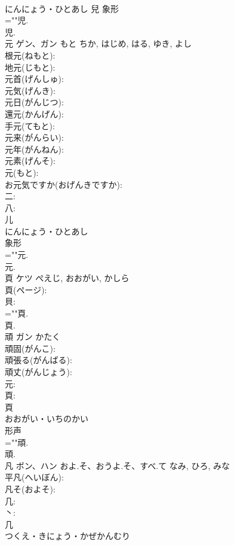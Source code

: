 \documentclass[8pt]{extreport}
\begin{document}
\begin{CJK}{UTF8}{min}
\\	にんにょう・ひとあし	兒	象形 
\\	=""児.
\\	児.
\\	元	ゲン、ガン	もと	ちか, はじめ, はる, ゆき, よし	
\\	根元(ねもと): 
\\	地元(じもと): 
\\	元首(げんしゅ): 
\\	元気(げんき): 
\\	元日(がんじつ): 
\\	還元(かんげん): 
\\	手元(てもと): 
\\	元来(がんらい): 
\\	元年(がんねん): 
\\	元素(げんそ): 
\\	元(もと): 
\\	お元気ですか(おげんきですか): 
\\	二: 
\\	八: 
\\	儿	
\\	にんにょう・ひとあし	
\\	象形 
\\	=""元.
\\	元.
\\	頁	ケツ	ぺえじ, おおがい, かしら		
\\	頁(ページ): 
\\	貝: 
\\	=""頁.
\\	頁.
\\	頑	ガン	かたく		
\\	頑固(がんこ): 
\\	頑張る(がんばる): 
\\	頑丈(がんじょう): 
\\	元: 
\\	頁: 
\\	頁	
\\	おおがい・いちのかい	
\\	形声 
\\	=""頑.
\\	頑.
\\	凡	ボン、ハン	およ.そ、おうよ.そ、すべ.て	なみ, ひろ, みな	
\\	平凡(へいぼん): 
\\	凡そ(およそ): 
\\	几: 
\\	丶: 
\\	几	
\\	つくえ・きにょう・かぜかんむり	

\end{CJK}
\end{document}

